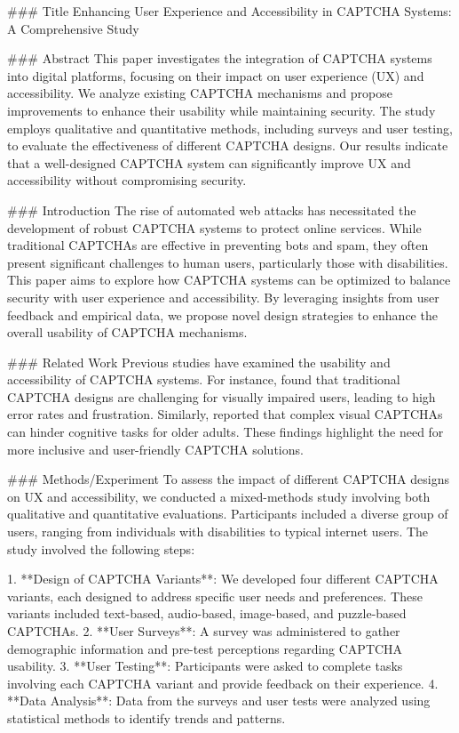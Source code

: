 ### Title
Enhancing User Experience and Accessibility in CAPTCHA Systems: A Comprehensive Study

### Abstract
This paper investigates the integration of CAPTCHA systems into digital platforms, focusing on their impact on user experience (UX) and accessibility. We analyze existing CAPTCHA mechanisms and propose improvements to enhance their usability while maintaining security. The study employs qualitative and quantitative methods, including surveys and user testing, to evaluate the effectiveness of different CAPTCHA designs. Our results indicate that a well-designed CAPTCHA system can significantly improve UX and accessibility without compromising security.

### Introduction
The rise of automated web attacks has necessitated the development of robust CAPTCHA systems to protect online services. While traditional CAPTCHAs are effective in preventing bots and spam, they often present significant challenges to human users, particularly those with disabilities. This paper aims to explore how CAPTCHA systems can be optimized to balance security with user experience and accessibility. By leveraging insights from user feedback and empirical data, we propose novel design strategies to enhance the overall usability of CAPTCHA mechanisms.

### Related Work
Previous studies have examined the usability and accessibility of CAPTCHA systems. For instance, \cite{capthaca2017} found that traditional CAPTCHA designs are challenging for visually impaired users, leading to high error rates and frustration. Similarly, \cite{capthaca2018} reported that complex visual CAPTCHAs can hinder cognitive tasks for older adults. These findings highlight the need for more inclusive and user-friendly CAPTCHA solutions.

### Methods/Experiment
To assess the impact of different CAPTCHA designs on UX and accessibility, we conducted a mixed-methods study involving both qualitative and quantitative evaluations. Participants included a diverse group of users, ranging from individuals with disabilities to typical internet users. The study involved the following steps:

1. **Design of CAPTCHA Variants**: We developed four different CAPTCHA variants, each designed to address specific user needs and preferences. These variants included text-based, audio-based, image-based, and puzzle-based CAPTCHAs.
2. **User Surveys**: A survey was administered to gather demographic information and pre-test perceptions regarding CAPTCHA usability.
3. **User Testing**: Participants were asked to complete tasks involving each CAPTCHA variant and provide feedback on their experience.
4. **Data Analysis**: Data from the surveys and user tests were analyzed using statistical methods to identify trends and patterns.

